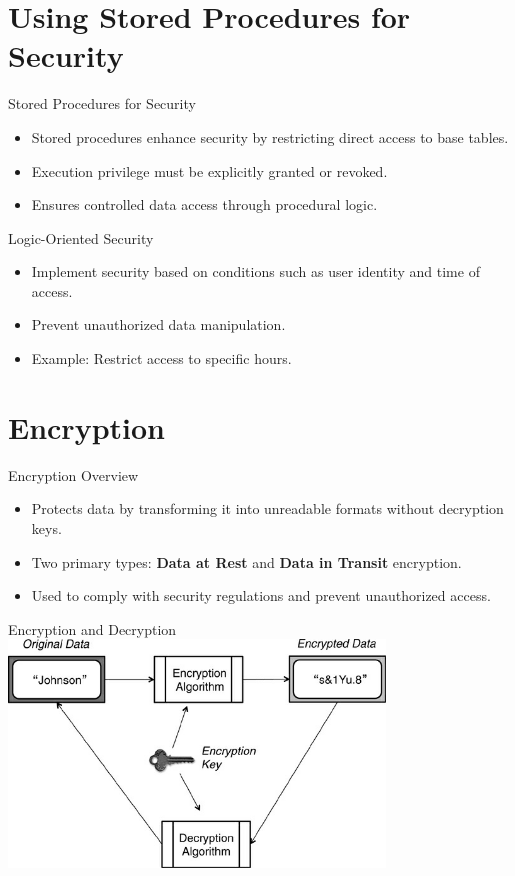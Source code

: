 \documentclass{beamer}
\begin{document}
\section{Using Stored Procedures for Security}

\begin{frame}{Stored Procedures for Security}
    \begin{itemize}
        \item Stored procedures enhance security by restricting direct access to base tables.
        \item Execution privilege must be explicitly granted or revoked.
        \item Ensures controlled data access through procedural logic.
    \end{itemize}
\end{frame}

\begin{frame}{Logic-Oriented Security}
    \begin{itemize}
        \item Implement security based on conditions such as user identity and time of access.
        \item Prevent unauthorized data manipulation.
        \item Example: Restrict access to specific hours.
    \end{itemize}
\end{frame}

\section{Encryption}

\begin{frame}{Encryption Overview}
    \begin{itemize}
        \item Protects data by transforming it into unreadable formats without decryption keys.
        \item Two primary types: \textbf{Data at Rest} and \textbf{Data in Transit} encryption.
        \item Used to comply with security regulations and prevent unauthorized access.
    \end{itemize}
\end{frame}

\begin{frame}{Encryption and Decryption}
    \centering
    \includegraphics[width=0.75\textwidth]{figures/encryption}
\end{frame}
\end{document}
